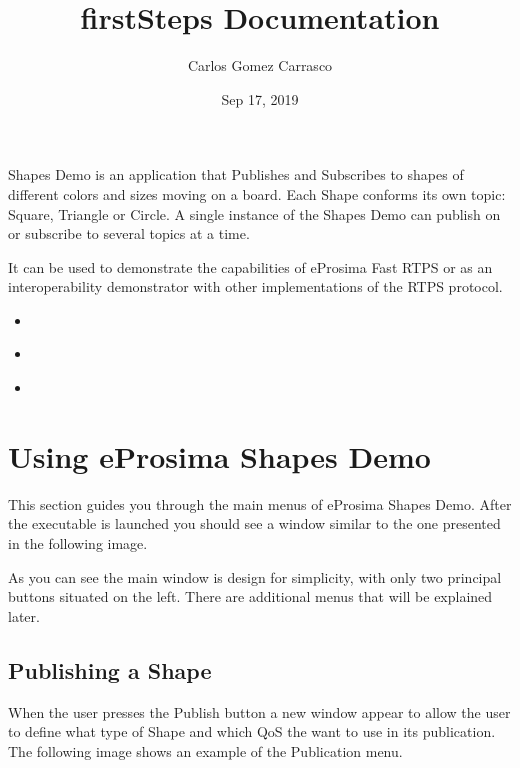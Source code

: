 \documentclass[letterpaper,10pt,english]{sphinxmanual}
\title{firstSteps Documentation}
\date{Sep 17, 2019}
\author{Carlos Gomez Carrasco}
\begin{document}
\pagestyle{empty}
\sphinxmaketitle
\pagestyle{plain}
\sphinxtableofcontents
\pagestyle{normal}
\label{\detokenize{index::doc}}


Shapes Demo is an application that Publishes and Subscribes to shapes of different colors and sizes moving on a board. Each Shape conforms its own topic: Square, Triangle or Circle. A single instance of the Shapes Demo can publish on or subscribe to several topics at a time.

It can be used to demonstrate the capabilities of eProsima Fast RTPS or as an interoperability demonstrator with other implementations of the RTPS protocol.
\begin{itemize}
\item {} 
{\hyperref[\detokenize{index:firststep}]{}}

\item {} 
{\hyperref[\detokenize{index:systemtest}]{}}

\item {} 
{\hyperref[\detokenize{index:troubleshooting}]{}}

\end{itemize}
\label{\detokenize{index:firststep}}

\chapter{Using eProsima Shapes Demo}
\label{\detokenize{firststept:using-eprosima-shapes-demo}}\label{\detokenize{firststept::doc}}
This section guides you through the main menus of eProsima Shapes Demo. After the executable is launched you should see a window similar to the one presented in the following image.


As you can see the main window is design for simplicity, with only two principal buttons situated on the left. There are additional menus that will be explained later.


\section{Publishing a Shape}
\label{\detokenize{firststept:publishing-a-shape}}
When the user presses the Publish button a new window appear to allow the user to define what type of Shape and which QoS the want to use in its publication. The following image shows an example of the Publication menu.
\end{document}
